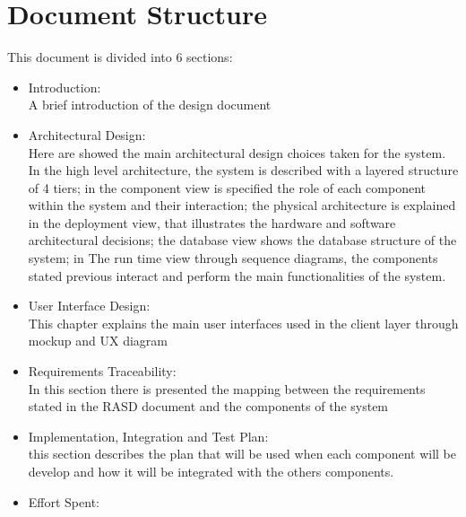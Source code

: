 \section{Document Structure}
This document is divided into 6 sections:
\begin{itemize}
\item Introduction:\\
A brief introduction of the design document


\item Architectural Design:\\
Here are showed the main architectural design choices taken for the system. In the high level architecture, the system is described with a layered structure of 4 tiers;  in the component view is specified the role of each component within the system and their interaction; the physical architecture is explained in the deployment view, that illustrates the hardware and software architectural decisions; the database view shows the database structure of the system; in The run time view through sequence diagrams, the components stated previous interact and perform the main functionalities of the system.


\item User Interface Design: \\
This chapter explains the main user interfaces used in
the client layer through mockup and UX diagram

\item Requirements Traceability: \\
In this section there is presented the mapping between the requirements stated in the RASD document and the components of the system

\item Implementation, Integration and Test Plan: \\
 this section describes the plan that will
be used when each component will be develop and how it will be integrated with the others components.

\item Effort Spent:\\


\end{itemize}